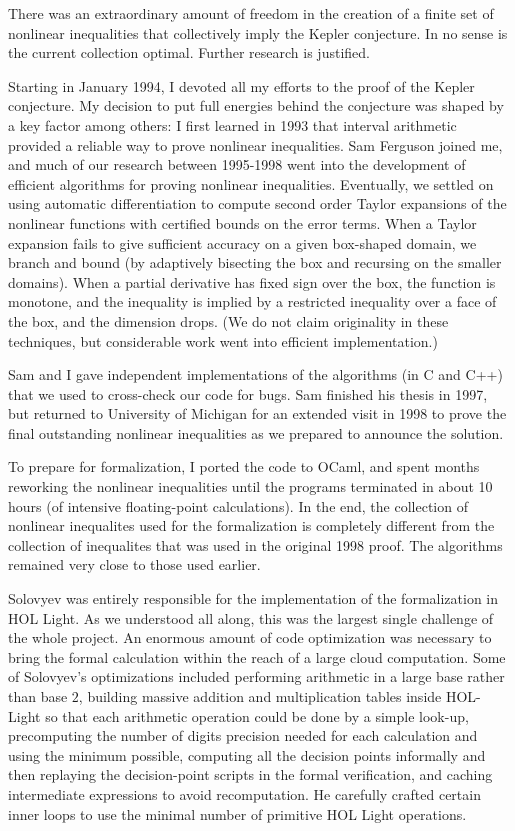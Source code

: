 \documentclass{amsart}
\begin{document}
There was an extraordinary amount of freedom in the creation
of a finite set of nonlinear inequalities that collectively imply
the Kepler conjecture.  In no sense is the current collection
optimal.  Further research is justified.

Starting in January 1994, I devoted all my efforts to the proof of the
Kepler conjecture.  My decision to put full energies behind the
conjecture was shaped by a key factor among others: I first learned in
1993 that interval arithmetic provided a reliable way to prove
nonlinear inequalities.  Sam Ferguson joined me, and much of our
research between 1995-1998 went into the development of efficient
algorithms for proving nonlinear inequalities.  Eventually, we settled
on using automatic differentiation to compute second order Taylor
expansions of the nonlinear functions with certified bounds on the
error terms.  When a Taylor expansion fails to give sufficient
accuracy on a given box-shaped domain, we branch and bound (by adaptively bisecting the
box and recursing on the smaller domains).  When a partial
derivative has fixed sign over the box, the function is
monotone, and the inequality is implied by a restricted inequality over a face
of the box, and the dimension drops.  (We do not claim
originality in these techniques, but considerable work went into
efficient implementation.)

Sam and I gave independent implementations of the algorithms (in C and
C++) that we used to cross-check our code for bugs. Sam finished his
thesis in 1997, but returned to University of Michigan for an
extended visit in 1998 to prove the final outstanding nonlinear
inequalities as we prepared to announce the solution.

To prepare for formalization, I ported the code to OCaml, and spent
months reworking the nonlinear inequalities until the programs
terminated in about 10 hours (of intensive floating-point
calculations).  In the end, the collection of nonlinear inequalites
used for the formalization is completely different from the collection
of inequalites that was used in the original 1998 proof.
The algorithms remained very close to those used earlier.

Solovyev was entirely responsible for the implementation of the
formalization in HOL Light.  As we understood all along, this was the
largest single challenge of the whole project.  An enormous amount of
code optimization was necessary to bring the formal calculation within
the reach of a large cloud computation.  Some of Solovyev's
optimizations included performing arithmetic in a large base rather
than base $2$, building massive addition and multiplication tables
inside HOL-Light so that each arithmetic operation could be done by a
simple look-up, precomputing the number of digits precision needed for
each calculation and using the minimum possible, computing all the
decision points informally and then replaying the decision-point
scripts in the formal verification, and caching intermediate
expressions to avoid recomputation.  He carefully crafted certain
inner loops to use the minimal number of primitive HOL Light
operations.
\end{document}
